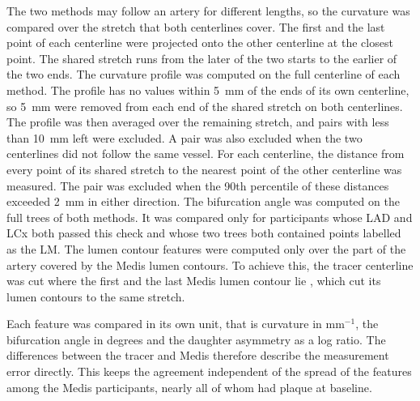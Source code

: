 The two methods may follow an artery for different lengths, so the curvature was compared over the stretch that both centerlines cover.
The first and the last point of each centerline were projected onto the other centerline at the closest point.
The shared stretch runs from the later of the two starts to the earlier of the two ends.
The curvature profile was computed on the full centerline of each method.
The profile has no values within 5~mm of the ends of its own centerline, so 5~mm were removed from each end of the shared stretch on both centerlines.
The profile was then averaged over the remaining stretch, and pairs with less than 10~mm left were excluded.
A pair was also excluded when the two centerlines did not follow the same vessel.
For each centerline, the distance from every point of its shared stretch to the nearest point of the other centerline was measured.
The pair was excluded when the 90th percentile of these distances exceeded 2~mm in either direction.
The bifurcation angle was computed on the full trees of both methods.
It was compared only for participants whose LAD and LCx both passed this check and whose two trees both contained points labelled as the LM.
The lumen contour features were computed only over the part of the artery covered by the Medis lumen contours.
To achieve this, the tracer centerline was cut where the first and the last Medis lumen contour lie \cite{schaap2009cat08}, which cut its lumen contours to the same stretch.

Each feature was compared in its own unit, that is curvature in mm$^{-1}$, the bifurcation angle in degrees and the daughter asymmetry as a log ratio.
The differences between the tracer and Medis therefore describe the measurement error directly.
This keeps the agreement independent of the spread of the features among the Medis participants, nearly all of whom had plaque at baseline.
